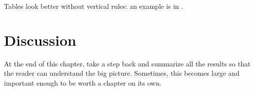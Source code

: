 Tables look better without vertical rules: an example is in .

\section{Discussion}

At the end of this chapter, take a step back and summarize all the results so that the reader
can understand the big picture. Sometimes, this becomes large and important enough to be worth
a chapter on its own.
